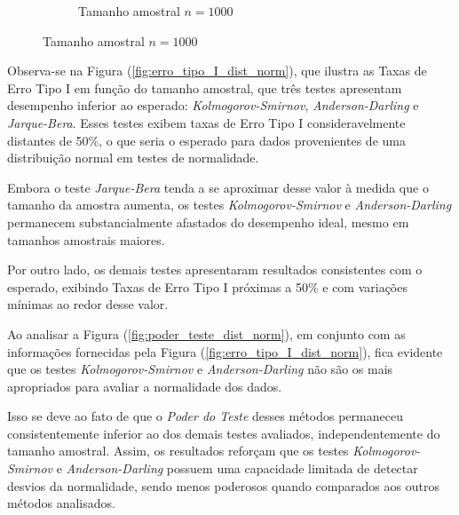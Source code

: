 \documentclass[a4paper,11pt]{article} %
\begin{document}
\begin{figure}[H]
\begin{subfigure}[b]{0.45\textwidth}
        \caption{Tamanho amostral \(n = 1000\)}
        \label{fig:cauchy_poder_1000}
    \end{subfigure}
\end{figure}

Observa-se na Figura (\ref{fig:erro_tipo_I_dist_norm}), que ilustra as Taxas de Erro Tipo I em função do tamanho amostral, que três testes apresentam desempenho inferior ao esperado: \textit{Kolmogorov-Smirnov}, \textit{Anderson-Darling} e \textit{Jarque-Bera}. Esses testes exibem taxas de Erro Tipo I consideravelmente distantes de 50\%, o que seria o esperado para dados provenientes de uma distribuição normal em testes de normalidade.

\vspace{0.5cm}

Embora o teste \textit{Jarque-Bera} tenda a se aproximar desse valor à medida que o tamanho da amostra aumenta, os testes \textit{Kolmogorov-Smirnov} e \textit{Anderson-Darling} permanecem substancialmente afastados do desempenho ideal, mesmo em tamanhos amostrais maiores.

\vspace{0.5cm}

Por outro lado, os demais testes apresentaram resultados consistentes com o esperado, exibindo Taxas de Erro Tipo I próximas a 50\% e com variações mínimas ao redor desse valor.

\vspace{0.5cm}

Ao analisar a Figura (\ref{fig:poder_teste_dist_norm}), em conjunto com as informações fornecidas pela Figura (\ref{fig:erro_tipo_I_dist_norm}), fica evidente que os testes \textit{Kolmogorov-Smirnov} e \textit{Anderson-Darling} não são os mais apropriados para avaliar a normalidade dos dados.

\vspace{0.5cm}

Isso se deve ao fato de que o \textit{Poder do Teste} desses métodos permaneceu consistentemente inferior ao dos demais testes avaliados, independentemente do tamanho amostral. Assim, os resultados reforçam que os testes \textit{Kolmogorov-Smirnov} e \textit{Anderson-Darling} possuem uma capacidade limitada de detectar desvios da normalidade, sendo menos poderosos quando comparados aos outros métodos analisados.

\vspace{0.5cm}
\end{document}
